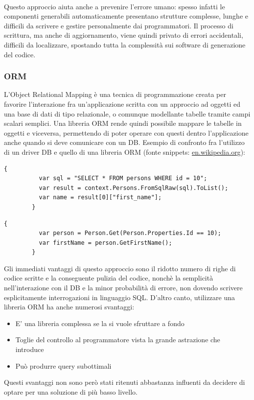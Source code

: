 \documentclass[a4paper, 12pt]{report}
\begin{document}
      \paragraph*{}Questo approccio aiuta anche a prevenire l'errore umano: spesso infatti le componenti generabili automaticamente presentano strutture complesse, lunghe e difficili da scrivere e gestire personalmente dai programmatori.
      Il processo di scrittura, ma anche di aggiornamento, viene quindi privato di errori accidentali, difficili da localizzare, spostando tutta la complessità sui software di generazione del codice.
    \subsubsection*{ORM}
      L'Object Relational Mapping è una tecnica di programmazione creata per favorire l'interazione fra un'applicazione scritta con un approccio ad oggetti ed una base di dati di tipo relazionale, o comunque modellante tabelle tramite campi scalari semplici.
      Una libreria ORM rende quindi possibile mappare le tabelle in oggetti e viceversa, permettendo di poter operare con questi dentro l'applicazione anche quando si deve comunicare con un DB.
      Esempio di confronto fra l'utilizzo di un driver DB e quello di una libreria ORM (fonte snippets: \href{https://en.wikipedia.org/wiki/Object%E2%80%93relational_mapping}{en.wikipedia.org}):
      \begin{Verbatim}[samepage=true]
        {
          var sql = "SELECT * FROM persons WHERE id = 10";
          var result = context.Persons.FromSqlRaw(sql).ToList();
          var name = result[0]["first_name"];
        }
      \end{Verbatim}
      \begin{Verbatim}[samepage=true]
        {
          var person = Person.Get(Person.Properties.Id == 10);
          var firstName = person.GetFirstName();
        }
      \end{Verbatim}
      Gli immediati vantaggi di questo approccio sono il ridotto numero di righe di codice scritte e la conseguente pulizia del codice, nonchè la semplicità nell'interazione con il DB e la minor probabilità di errore, non dovendo scrivere esplicitamente interrogazioni in linguaggio SQL.
      D'altro canto, utilizzare una libreria ORM ha anche numerosi svantaggi:
      \begin{itemize}
        \item E' una libreria complessa se la si vuole sfruttare a fondo
        \item Toglie del controllo al programmatore vista la grande astrazione che introduce
        \item Può produrre query subottimali
      \end{itemize}
      Questi svantaggi non sono però stati ritenuti abbastanza influenti da decidere di optare per una soluzione di più basso livello.
    \newpage
\end{document}
